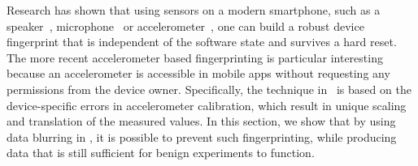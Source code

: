 

Research has shown that using sensors on a modern smartphone, such as 
a speaker~\cite{das2014poster}, microphone~\cite{clarkson2012breaking} 
or accelerometer~\cite{bojinov2014mobile, dey2014accelprint}, one can 
build a robust device fingerprint that is independent of the software state
and survives a hard reset. The more recent accelerometer based fingerprinting
is particular interesting because an accelerometer is accessible in mobile apps
without requesting any permissions from the device owner. Specifically, the 
technique in~\cite{bojinov2014mobile} is based on the device-specific errors in 
accelerometer calibration, which result in unique scaling and translation of 
the measured values. In this section, we show that by using data blurring in 
\sysname, it is possible to prevent such fingerprinting, while producing data that
is still sufficient for benign experiments to function. 


